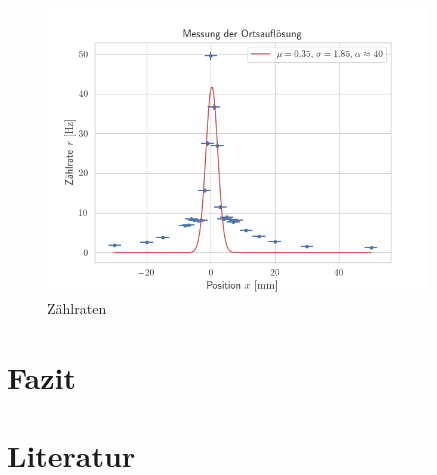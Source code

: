 \documentclass[12pt,a4paper]{scrartcl}
\numberwithin{equation}{section} %
\renewcommand{\[}{} %
\renewcommand{\]}{\noindent} %
\begin{document}
\begin{figure}[H]
	\centering
	\includegraphics[width=0.9\textwidth]{../media/B3.4/Ortsaufloesung_fit.png}
	\caption{Zählraten}
	\label{abb:zaehlrate}
\end{figure}

\clearpage
\hypertarget{fazit}{%
\section{Fazit}\label{fazit}}

\clearpage
\hypertarget{literatur}{%
\section{Literatur}\label{literatur}}
\end{document}
